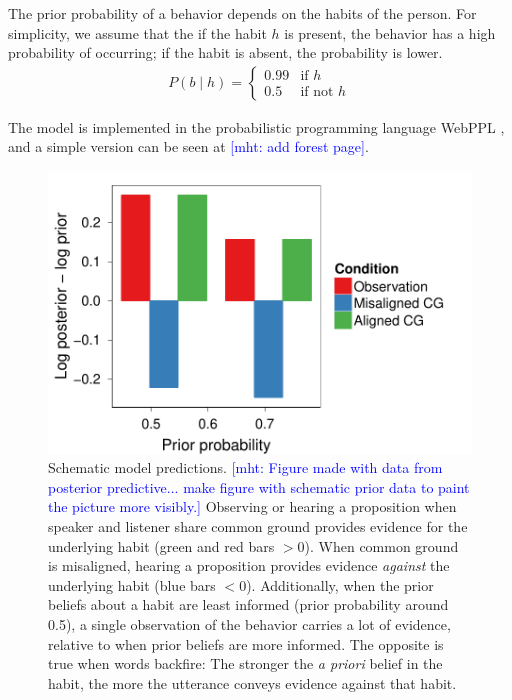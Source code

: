 \documentclass[10pt,letterpaper]{article}
\newcommand{\mht}[1]{\textcolor{Blue}{[mht: #1]}}
\begin{document}
The prior probability of a behavior depends on the habits of the person. For simplicity, we assume that the if the habit $h$ is present, the behavior has a high probability of occurring; if the habit is absent, the probability is lower. 
\begin{eqnarray}
P(b \mid h) = \begin{cases}
0.99  & \text{if } h\\
0.5  & \text{if not } h
\end{cases} \label{eq:hab}
\end{eqnarray}

The model is implemented in the probabilistic programming language WebPPL \cite{dippl}, and a simple version can be seen at \mht{add forest page}.

\begin{figure}
\centering
    \includegraphics[width=\columnwidth]{schematic-model}
    \caption{Schematic model predictions.
    \mht{Figure made with data from posterior predictive... make figure with schematic prior data to paint the picture more visibly.}
    Observing or hearing a proposition when speaker and listener share common ground provides evidence for the underlying habit (green and red bars $> 0$). 
    When common ground is misaligned, hearing a proposition provides evidence \emph{against} the underlying habit (blue bars $<0$).
    Additionally, when the prior beliefs about a habit are least informed (prior probability around 0.5), a single observation of the behavior carries a lot of evidence, relative to when prior beliefs are more informed. 
    The opposite is true when words backfire: The stronger the \emph{a priori} belief in the habit, the more the utterance conveys evidence against that habit. }
  \label{fig:schematic-model}
\end{figure}
\end{document}
